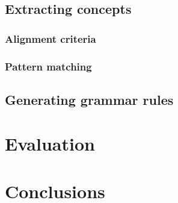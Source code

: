 \documentclass[11pt]{article}
\begin{document}
\subsection{Extracting concepts} 

\subsubsection{Alignment criteria}


\subsubsection{Pattern matching}

\subsection{Generating grammar rules}

\section{Evaluation} \label{evaluation}

\section{Conclusions} \label{conclusions}

%
%
\end{document}
